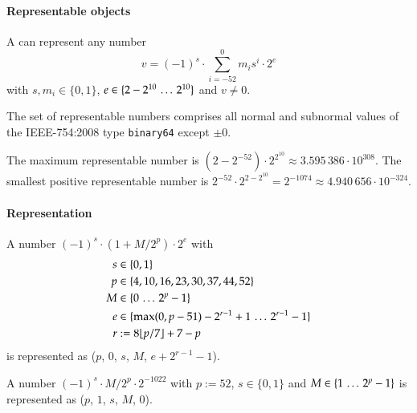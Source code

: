 \paragraph{Representable objects}

A \DborBinaryRationalValue can represent any number
\begin{equation}
    v = (-1)^s \cdot \sum_{i = -52}^0 m_i s^i \cdot 2^e
\end{equation}
with $s, m_i \in \{0, 1\}$, $e \in \{2 - 2^{10} \,\ldots\, 2^{10}\}$ and $v \ne 0$.

The set of representable numbers comprises all normal and subnormal values of the IEEE-754:2008 type
\texttt{binary64} except $\pm 0$.

\smallskip
The maximum representable number is $(2 - 2^{-52}) \cdot 2^{2^{10}} \approx 3.595\,386 \cdot 10^{308}$.
The smallest positive representable number is $2^{-52} \cdot 2^{2-2^{10}} = 2^{-1074}
\approx 4.940\,656 \cdot 10^{-324}$.

\paragraph{Representation}

A number $(-1)^s \cdot (1 + M/2^p) \cdot 2^e$ with
\begin{align*}
    s & \in \{0, 1\} \\
    p & \in \{4, 10, 16, 23, 30, 37, 44, 52\} \\
    M & \in \{0 \,\ldots\, 2^p - 1\} \\
    e & \in \{\max(0, p - 51) - 2^{r - 1} + 1 \,\ldots\, 2^{r - 1} - 1\} \\
    r & := 8 \lfloor p / 7 \rfloor + 7 - p
\end{align*}%
is represented as
\DborBinaryRationalToken*($p$, $0$, $s$, $M$, $e + 2^{r - 1} - 1$).

A number $(-1)^s \cdot M/2^p \cdot 2^{-1022}$ with $p := 52$, $s \in \{0, 1\}$ and
$M \in \{1 \,\ldots\, 2^p - 1\}$ is represented as \DborBinaryRationalToken*($p$, $1$, $s$, $M$, $0$).


